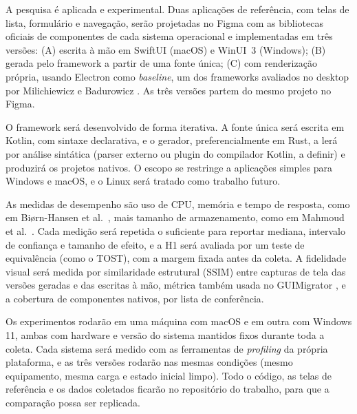 
A pesquisa é aplicada e experimental. Duas aplicações de referência, com telas de lista, formulário e navegação, serão projetadas no Figma com as bibliotecas oficiais de componentes de cada sistema operacional e implementadas em três versões: (A) escrita à mão em SwiftUI (macOS) e WinUI~3 (Windows); (B) gerada pelo framework a partir de uma fonte única; (C) com renderização própria, usando Electron como \textit{baseline}, um dos frameworks avaliados no desktop por Milichiewicz e Badurowicz \cite{milichiewicz2025comparative}. As três versões partem do mesmo projeto no Figma.

O framework será desenvolvido de forma iterativa. A fonte única será escrita em Kotlin, com sintaxe declarativa, e o gerador, preferencialmente em Rust, a lerá por análise sintática (parser externo ou plugin do compilador Kotlin, a definir) e produzirá os projetos nativos. O escopo se restringe a aplicações simples para Windows e macOS, e o Linux será tratado como trabalho futuro.

As medidas de desempenho são uso de CPU, memória e tempo de resposta, como em Biørn-Hansen et al.\ \cite{biorn2020empirical}, mais tamanho de armazenamento, como em Mahmoud et al.\ \cite{mahmoud2024trans}. Cada medição será repetida o suficiente para reportar mediana, intervalo de confiança e tamanho de efeito, e a H1 será avaliada por um teste de equivalência (como o TOST), com a margem fixada antes da coleta. A fidelidade visual será medida por similaridade estrutural (SSIM) entre capturas de tela das versões geradas e das escritas à mão, métrica também usada no GUIMigrator \cite{gao2026guimigrator}, e a cobertura de componentes nativos, por lista de conferência.

Os experimentos rodarão em uma máquina com macOS e em outra com Windows 11, ambas com hardware e versão do sistema mantidos fixos durante toda a coleta. Cada sistema será medido com as ferramentas de \textit{profiling} da própria plataforma, e as três versões rodarão nas mesmas condições (mesmo equipamento, mesma carga e estado inicial limpo). Todo o código, as telas de referência e os dados coletados ficarão no repositório do trabalho, para que a comparação possa ser replicada.
